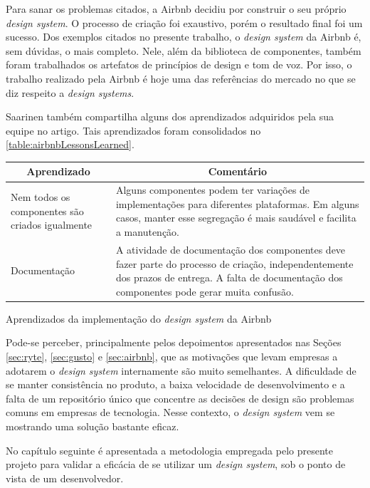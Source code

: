 Para sanar os problemas citados, a Airbnb decidiu por construir o seu próprio \textit{design system}. O processo de criação foi exaustivo, porém o resultado final foi um sucesso. Dos exemplos citados no presente trabalho, o \textit{design system} da Airbnb é, sem dúvidas, o mais completo. Nele, além da biblioteca de componentes, também foram trabalhados os artefatos de princípios de design e tom de voz. Por isso, o trabalho realizado pela Airbnb é hoje uma das referências do mercado no que se diz respeito a \textit{design systems}.

Saarinen também compartilha alguns dos aprendizados adquiridos pela sua equipe no artigo. Tais aprendizados foram consolidados no \autoref{table:airbnbLessonsLearned}.

\begin{quadro}
\centering
\begin{tabular}{|m{4cm}|m{10cm}|} \hline

	\multicolumn{1}{|c|}{\bfseries Aprendizado} & \multicolumn{1}{c|}{\bfseries Comentário} \\\hline
	
	 Nem todos os componentes são criados igualmente & Alguns componentes podem ter variações de implementações para diferentes plataformas. Em alguns casos, manter esse segregação é mais saudável e facilita a manutenção. \\\hline
	 
	 Documentação & A atividade de documentação dos componentes deve fazer parte do processo de criação, independentemente dos prazos de entrega. A falta de documentação dos componentes pode gerar muita confusão. \\\hline
    
\end{tabular}
\caption{Aprendizados da implementação do \textit{design system} da Airbnb}
\label{table:airbnbLessonsLearned}
\end{quadro}

Pode-se perceber, principalmente pelos depoimentos apresentados nas Seções \ref{sec:ryte}, \ref{sec:gusto} e \ref{sec:airbnb}, que as motivações que levam empresas a adotarem o \textit{design system} internamente são muito semelhantes. A dificuldade de se manter consistência no produto, a baixa velocidade de desenvolvimento e a falta de um repositório único que concentre as decisões de design são problemas comuns em empresas de tecnologia. Nesse contexto, o \textit{design system} vem se mostrando uma solução bastante eficaz.

No capítulo seguinte é apresentada a metodologia empregada pelo presente projeto para validar a eficácia de se utilizar um \textit{design system}, sob o ponto de vista de um desenvolvedor.
